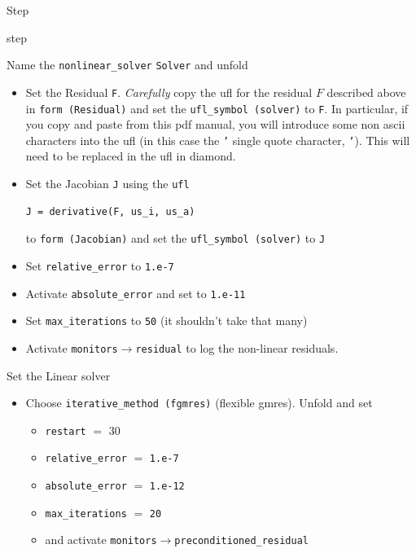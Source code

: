 \begin{steps}{Step}
\begin{steps}{step}
\begin{itemize}
    \end{itemize}
  \item Name the \texttt{nonlinear\_solver} \texttt{Solver} and unfold
    \begin{itemize}
    \item Set the Residual \texttt{F}.  \emph{Carefully} copy the ufl for the
      residual $F$ described
      above in \texttt{form (Residual)} and set the
      \texttt{ufl\_symbol (solver)} to \texttt{F}.  In particular, if
      you copy and paste from this pdf manual, you will introduce some
      non ascii characters into the ufl (in this case the \texttt{'}
      single quote character,  \texttt{'}).  This will need to be
      replaced in the ufl in diamond.
    \item Set the Jacobian \texttt{J} using  the \texttt{ufl}
      \begin{lstlisting}[style=UFL]
        J = derivative(F, us_i, us_a)
      \end{lstlisting}
      to \texttt{form (Jacobian)} and set the \texttt{ufl\_symbol
        (solver)} to \texttt{J}
    \item Set \texttt{relative\_error} to \texttt{1.e-7}
    \item Activate \texttt{absolute\_error} and set to \texttt{1.e-11}
    \item Set \texttt{max\_iterations} to \texttt{50} (it shouldn't
      take that many)
    \item Activate \texttt{monitors}$\rightarrow$\texttt{residual} to
      log the non-linear residuals.
    \end{itemize}
  \item Set the Linear solver
    \begin{itemize}
    \item Choose \texttt{iterative\_method (fgmres)} (flexible
      gmres). Unfold and set
      \begin{itemize}
      \item \texttt{restart} $=$ 30
      \item \texttt{relative\_error} $=$ \texttt{1.e-7}
      \item \texttt{absolute\_error} $=$  \texttt{1.e-12}
      \item \texttt{max\_iterations} $=$  \texttt{20}
      \item and activate \texttt{monitors}$\rightarrow$\texttt{preconditioned\_residual}
      \end{itemize}


\end{itemize}
\end{steps}
\end{steps}
